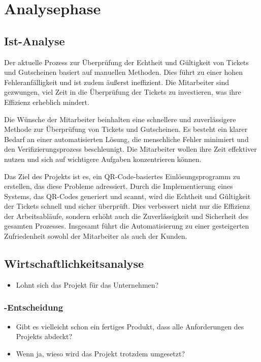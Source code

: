 \section{Analysephase} 
\label{sec:Analysephase}


\subsection{Ist-Analyse} 
\label{sec:IstAnalyse}

Der aktuelle Prozess zur Überprüfung der Echtheit und Gültigkeit von Tickets und Gutscheinen basiert auf manuellen Methoden. Dies führt zu einer hohen Fehleranfälligkeit und ist zudem äußerst ineffizient. Die Mitarbeiter sind gezwungen, viel Zeit in die Überprüfung der Tickets zu investieren, was ihre Effizienz erheblich mindert.

Die Wünsche der Mitarbeiter beinhalten eine schnellere und zuverlässigere Methode zur Überprüfung von Tickets und Gutscheinen. Es besteht ein klarer Bedarf an einer automatisierten Lösung, die menschliche Fehler minimiert und den Verifizierungsprozess beschleunigt. Die Mitarbeiter wollen ihre Zeit effektiver nutzen und sich auf wichtigere Aufgaben konzentrieren können.

Das Ziel des Projekts ist es, ein QR-Code-basiertes Einlösungsprogramm zu erstellen, das diese Probleme adressiert. Durch die Implementierung eines Systems, das QR-Codes generiert und scannt, wird die Echtheit und Gültigkeit der Tickets schnell und sicher überprüft. Dies verbessert nicht nur die Effizienz der Arbeitsabläufe, sondern erhöht auch die Zuverlässigkeit und Sicherheit des gesamten Prozesses. Insgesamt führt die Automatisierung zu einer gesteigerten Zufriedenheit sowohl der Mitarbeiter als auch der Kunden.

\subsection{Wirtschaftlichkeitsanalyse}
\label{sec:Wirtschaftlichkeitsanalyse}
\begin{itemize}
	\item Lohnt sich das Projekt für das Unternehmen?
\end{itemize}


\subsubsection{-Entscheidung}
\label{sec:MakeOrBuyEntscheidung}
\begin{itemize}
	\item Gibt es vielleicht schon ein fertiges Produkt, dass alle Anforderungen des Projekts abdeckt?
	\item Wenn ja, wieso wird das Projekt trotzdem umgesetzt?
\end{itemize}


